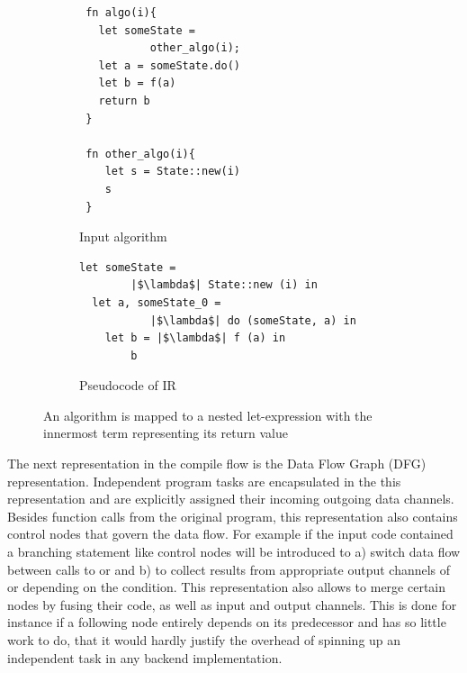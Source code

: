 \begin{figure}
    \centering
    \begin{subfigure}[b]{0.45\textwidth}
         \centering
         \begin{verbatim}
 fn algo(i){
   let someState = 
           other_algo(i);
   let a = someState.do()
   let b = f(a)
   return b
 }

 fn other_algo(i){
    let s = State::new(i)
    s
 }
            \end{verbatim}
         \caption{Input algorithm}
         \label{simplPyInput}
     \end{subfigure}
     \hfill
     \begin{subfigure}[b]{0.5\textwidth}
         \centering
         \begin{verbatim}
let someState = 
        |$\lambda$| State::new (i) in
  let a, someState_0 = 
           |$\lambda$| do (someState, a) in
    let b = |$\lambda$| f (a) in
        b
        \end{verbatim}
        \vspace{15mm}
    \caption{Pseudocode of IR}
         \label{simplIR}
    \end{subfigure}
\caption{An algorithm is mapped to a nested let-expression with the innermost term representing its return value}
\label{fig:funBodyTranslation}
\end{figure}

The next representation in the compile flow is the Data Flow Graph (DFG) representation. Independent program tasks are encapsulated in the this representation and are explicitly assigned their incoming outgoing data channels. Besides function calls from the original program, this representation also contains control nodes that govern the data flow. For example if the input code contained a branching statement like  control nodes will be introduced to a) switch data flow between calls to  or  and b) to collect results from appropriate output channels of  or  depending on the condition. This representation also allows to merge certain nodes by fusing their code, as well as input and output channels. This is done for instance if a following node entirely depends on its predecessor and has so little work to do, that it would hardly justify the overhead of spinning up an independent task in any backend implementation.\\

